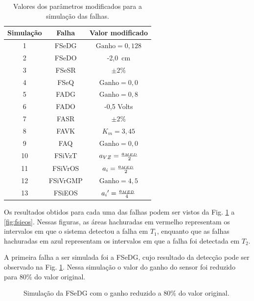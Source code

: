 \begin{table}[htb]
\centering
\caption{Valores dos parâmetros modificados para a simulação das falhas.}
\label{tab:valores_parametros}
\vspace{0.25cm}
\begin{tabular}{|c|c|c|}
\hline
{\bf Simulação} & {\bf Falha} & {\bf Valor modificado}\\
\hline
\hline
1 & FSeDG & $\text{Ganho} = 0,128$\\
\hline
2 & FSeDO & -2,0\ cm\\
\hline
3 & FSeSR & $\pm 2\%$\\
\hline
4 & FSeQ & $\text{Ganho} = 0,0$\\
\hline
\hline
5 & FADG & $\text{Ganho} = 0,8$\\
\hline
6 & FADO & -0,5 Volts\\
\hline
7 & FASR & $\pm 2\%$\\
\hline
8 & FAVK & $K_m = 3,45$\\ 
\hline
9 & FAQ & $\text{Ganho} = 0,0$\\
\hline
\hline
10 & FSiVzT & $a_{\tiny VZ} = \frac{a_{\tiny MED}}{2}$\\
\hline
11 & FSiVrOS & $a_i = \frac{a_{\tiny MED}}{2}$\\
\hline
12 & FSiVrGMP & $\text{Ganho} = 4,5$\\
\hline
13 & FSiEOS & ${a_i}' = \frac{a_{\tiny MED}}{4}$\\
\hline
\end{tabular}
\end{table}

Os resultados obtidos para cada uma das falhas podem ser vistos da Fig.
\ref{fig:fsedg} a \ref{fig:fsieos}. Nessas figuras, as áreas hachuradas em
vermelho representam os intervalos em que o sistema detectou a falha em $T_1$,
enquanto que as falhas hachuradas em azul representam os intervalos em que a
falha foi detectada em $T_2$.

A primeira falha a ser simulada foi a FSeDG, cujo resultado da detecção pode ser
observado na Fig. \ref{fig:fsedg}. Nessa simulação o valor do ganho do sensor
foi reduzido para 80\% do valor original.

\begin{figure}[htb]
\footnotesize
\centering

\vspace{1cm}
\caption{Simulação da FSeDG com o ganho reduzido a 80\% do valor original.}
\label{fig:fsedg}
\end{figure}

